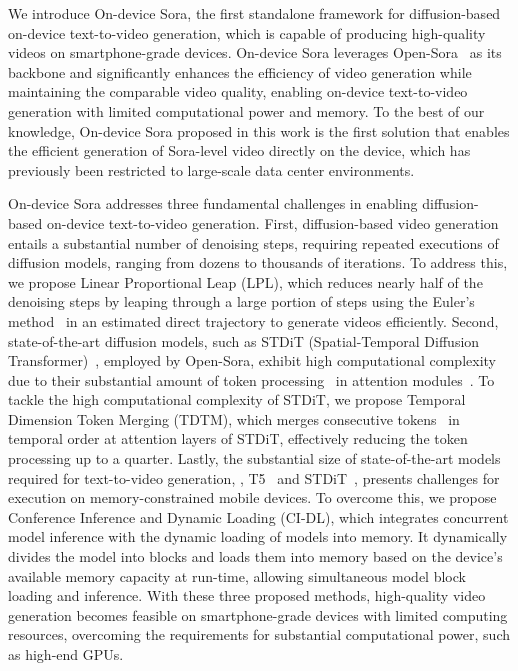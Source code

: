 We introduce On-device Sora, the first standalone framework for diffusion-based on-device text-to-video generation, which is capable of producing high-quality videos on smartphone-grade devices. On-device Sora leverages Open-Sora~\cite{opensora} as its backbone and significantly enhances the efficiency of video generation while maintaining the comparable video quality, enabling on-device text-to-video generation with limited computational power and memory. To the best of our knowledge, On-device Sora proposed in this work is the first solution that enables the efficient generation of Sora-level video directly on the device, which has previously been restricted to large-scale data center environments.

On-device Sora addresses three fundamental challenges in enabling diffusion-based on-device text-to-video generation. First, diffusion-based video generation entails a substantial number of denoising steps, requiring repeated executions of diffusion models, ranging from dozens to thousands of iterations. To address this, we propose Linear Proportional Leap (LPL), which reduces nearly half of the denoising steps by leaping through a large portion of steps using the Euler's method~\cite{biswas2013discussion} in an estimated direct trajectory to generate videos efficiently.
Second, state-of-the-art diffusion models, such as STDiT (Spatial-Temporal Diffusion Transformer)~\cite{opensora}, employed by Open-Sora, exhibit high computational complexity due to their substantial amount of token processing~\cite{bolya2022token} in attention modules~\cite{vaswani2017attention}. To tackle the high computational complexity of STDiT, we propose Temporal Dimension Token Merging (TDTM), which merges consecutive tokens~\cite{bolya2022token,bolya2023token} in temporal order at attention layers of STDiT, effectively reducing the token processing up to a quarter.
Lastly, the substantial size of state-of-the-art models required for text-to-video generation, \ie, T5~\cite{raffel2020exploring} and STDiT~\cite{opensora}, presents challenges for execution on memory-constrained mobile devices. To overcome this, we propose Conference Inference and Dynamic Loading (CI-DL), which integrates concurrent model inference with the dynamic loading of models into memory. It dynamically divides the model into blocks and loads them into memory based on the device's available memory capacity at run-time, allowing simultaneous model block loading and inference. With these three proposed methods, high-quality video generation becomes feasible on smartphone-grade devices with limited computing resources, overcoming the requirements for substantial computational power, such as high-end GPUs.

